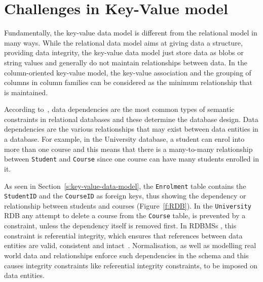 \section{Challenges in Key-Value model}\label{s:challenges-key-value}
Fundamentally,   the key-value data model is different from the relational model
in many ways.  While the relational data model aims at giving data a structure,  
providing data integrity,   the key-value data model just
store data as \acp{blob} or string values and generally do not maintain
relationships between data.  In the column-oriented key-value model,   the
key-value association and the grouping of columns in column families can be
considered as the minimum relationship that is maintained.

According to~\citet{Bell},   data dependencies
are the most common types of semantic constraints in relational databases and these
determine the database design.  Data dependencies are the various relationships
that may exist between data entities in a database.  For example,   in the
University database,   a student can enrol into more than one course and this
means that there is a many-to-many relationship between \texttt{Student} and
\texttt{Course} since   one course can have many students enrolled in it.

As seen in Section~\ref{s:key-value-data-model},   the \texttt{Enrolment} table
contains the \texttt{StudentID} and the \texttt{CourseID} as foreign keys, thus
showing the dependency or relationship between students and courses
(Figure~\ref{f:RDB}).
In the \texttt{University} \ac{RDB} any attempt to delete a course from the
\texttt{Course} table,   is prevented by a constraint,   unless the dependency
itself is removed first.  In \acp{RDBMS} ,   this constraint is referential
integrity,   which ensures that references between data entities are valid,
consistent and intact~\citep{blaha,date}.
Normalisation,   as well as modelling real world data and relationships enforce
such dependencies in the schema and this causes integrity constraints like
referential integrity constraints,   to be imposed on data entities.

